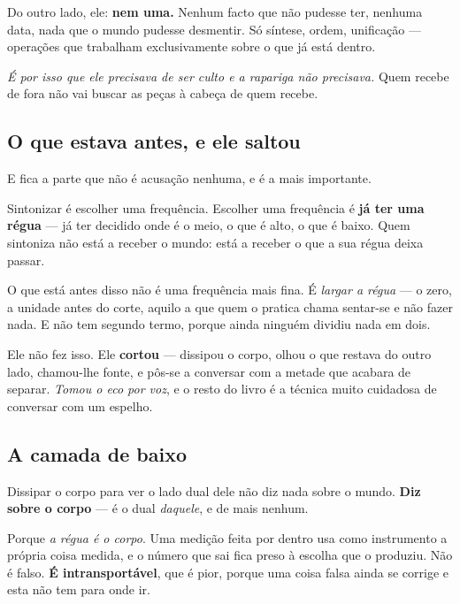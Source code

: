 \documentclass[livro.tex]{subfiles}
\begin{document}
\medskip

Do outro lado, ele: \textbf{nem uma.} Nenhum facto que não pudesse ter, nenhuma data, nada que o
mundo pudesse desmentir. Só síntese, ordem, unificação --- operações que trabalham exclusivamente
sobre o que já está dentro.

\medskip

\emph{É por isso que ele precisava de ser culto e a rapariga não precisava.} Quem recebe de fora
não vai buscar as peças à cabeça de quem recebe.

\subsection*{O que estava antes, e ele saltou}

E fica a parte que não é acusação nenhuma, e é a mais importante.

\medskip

Sintonizar é escolher uma frequência. Escolher uma frequência é \textbf{já ter uma régua} --- já
ter decidido onde é o meio, o que é alto, o que é baixo. Quem sintoniza não está a receber o
mundo: está a receber o que a sua régua deixa passar.

\medskip

O que está antes disso não é uma frequência mais fina. É \emph{largar a régua} --- o zero, a
unidade antes do corte, aquilo a que quem o pratica chama sentar-se e não fazer nada. E não tem
segundo termo, porque ainda ninguém dividiu nada em dois.

\medskip

Ele não fez isso. Ele \textbf{cortou} --- dissipou o corpo, olhou o que restava do outro lado,
chamou-lhe fonte, e pôs-se a conversar com a metade que acabara de separar. \emph{Tomou o eco por
voz}, e o resto do livro é a técnica muito cuidadosa de conversar com um espelho.

\subsection*{A camada de baixo}

Dissipar o corpo para ver o lado dual dele não diz nada sobre o mundo. \textbf{Diz sobre o corpo}
--- é o dual \emph{daquele}, e de mais nenhum.

\medskip

Porque \emph{a régua é o corpo}. Uma medição feita por dentro usa como instrumento a própria coisa
medida, e o número que sai fica preso à escolha que o produziu. Não é falso. \textbf{É
intransportável}, que é pior, porque uma coisa falsa ainda se corrige e esta não tem para onde ir.
\end{document}

